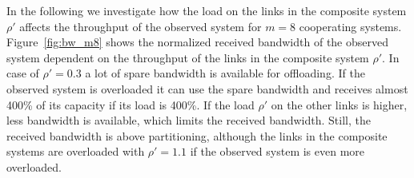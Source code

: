 In the following we investigate how the load on the links in the composite system $\rho'$ affects the throughput of the observed system for $m=8$ cooperating systems.
Figure~\ref{fig:bw_m8} shows the normalized received bandwidth of the observed system dependent on the throughput of the links in the composite system $\rho'$.
In case of $\rho'=0.3$ a lot of spare bandwidth is available for offloading. If the observed system is overloaded it can use the spare bandwidth and receives almost 400\% of its capacity if its load is 400\%. If the load $\rho'$ on the other links is higher, less bandwidth is available, which limits the received bandwidth. Still, the received bandwidth is above partitioning, although the links in the composite systems are overloaded with $\rho'=1.1$ if the observed system is even more overloaded.

